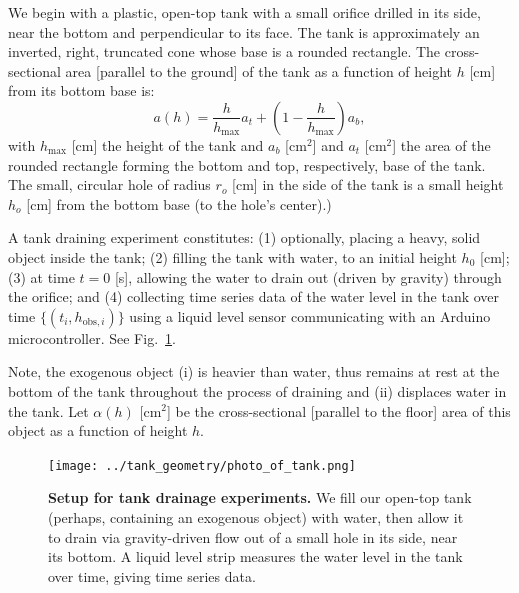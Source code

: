 \documentclass[openacc]{rsproca_new}%
\begin{document}
We begin with a plastic, open-top tank with a small orifice drilled in its side, near the bottom and perpendicular to its face.
The tank is approximately an inverted, right, truncated cone whose base is a rounded rectangle. The cross-sectional area [parallel to the ground] of the tank as a function of height $h$ [cm] from its bottom base is:
\begin{equation}
	a(h) = \frac{h}{h_{\text{max}}}a_t + \left(1-\frac{h}{h_{\text{max}}}\right) a_b, \label{eq:a_of_h}
\end{equation}
with $h_{\text{max}}$ [cm] the height of the tank and $a_b$ [cm$^2$] and $a_t$ [cm$^2$] the area of the rounded rectangle forming the bottom and top, respectively, base of the tank.
The small, circular hole of radius $r_o$ [cm] in the side of the tank is a small height $h_o$ [cm] from the bottom base (to the hole's center).)

A tank draining experiment constitutes: (1) optionally, placing a heavy, solid object inside the tank; (2) filling the tank with water, to an initial height $h_0$ [cm]; (3) at time $t=0$ [s], allowing the water to drain out (driven by gravity) through the orifice; and (4) collecting time series data of the water level in the tank over time $\{(t_i, h_{\text{obs}, i}) \}$ using a liquid level sensor communicating with an Arduino microcontroller. See Fig.~\ref{fig:photo_of_tank}.

Note, the exogenous object (i) is heavier than water, thus remains at rest at the bottom of the tank throughout the process of draining and (ii) displaces water in the tank.
Let $\alpha(h)$ [cm$^2$] be the cross-sectional [parallel to the floor] area of this object as a function of height $h$.

\begin{figure}[h!]
\begin{center}
	\texttt{[image: ../tank\_geometry/photo\_of\_tank.png]}
	\caption{\textbf{Setup for tank drainage experiments.}
	We fill our open-top tank (perhaps, containing an exogenous object) with water, then allow it to drain via gravity-driven flow out of a small hole in its side, near its bottom. A liquid level strip measures the water level in the tank over time, giving time series data.
	}
	\label{fig:photo_of_tank}
\end{center}
\end{figure}
\end{document}
